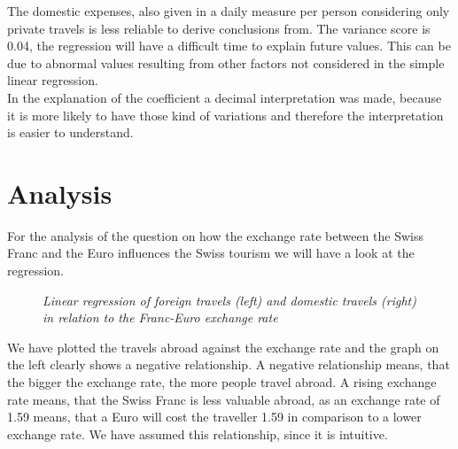 \documentclass[12pt,a4paper,bibliography=totocnumbered,listof=totocnumbered]{scrartcl}
\begin{document}
The domestic expenses, also given in a daily measure per person considering only private travels is less reliable to derive conclusions from. The variance score is 0.04, the regression will have a difficult time to explain future values. This can be due to abnormal values resulting from other factors not considered in the simple linear regression. \\

In the explanation of the coefficient a decimal interpretation was made, because it is more likely to have those kind of variations and therefore the interpretation is easier to understand.   

\section{Analysis}
For the analysis of the question on how the exchange rate between the Swiss Franc and the Euro influences the Swiss tourism we will have a look at the regression. 

\begin{figure} [htbp]
\centering
     \qquad
\caption{\textit{Linear regression of foreign travels (left) and domestic travels (right) in relation to the Franc-Euro exchange rate}}
\end{figure}

We have plotted the travels abroad against the exchange rate and the graph on the left clearly shows a negative relationship. A negative relationship means, that the bigger the exchange rate, the more people travel abroad. A rising exchange rate means, that the Swiss Franc is less valuable abroad, as an exchange rate of 1.59 means, that a Euro will cost the traveller 1.59 in comparison to a lower exchange rate. We have assumed this relationship, since it is intuitive. 
\ \\
\end{document}
